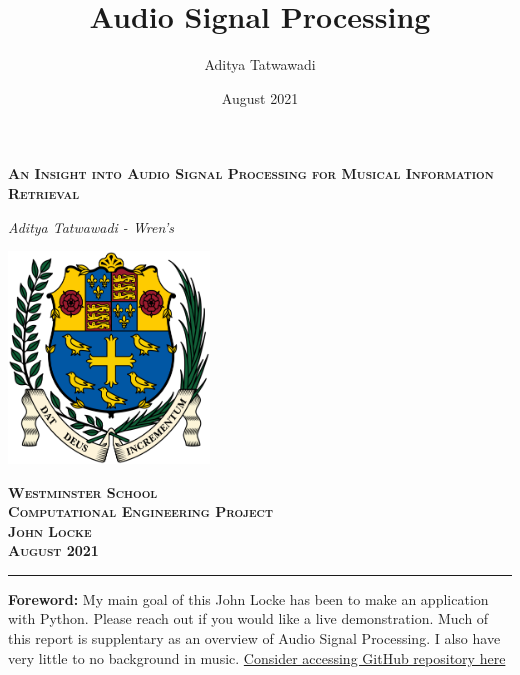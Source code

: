 \documentclass[a4paper,12pt]{article}
\author{Aditya Tatwawadi}
\title{Audio Signal Processing}
\date{August 2021}
\begin{document}
    \begin{titlepage}
        \begin{center}
            \vspace*{1cm}
    
            \LARGE
            \textsc{\textbf{An Insight into Audio Signal Processing for Musical Information Retrieval}}
    
            \vspace{0.5cm}
                
            \textit{Aditya Tatwawadi - Wren's}
                
            \vspace{4cm}
            \LARGE
            \includegraphics[width=0.4\textwidth]{westminsterschool}
            
            \Large
            \textsc{\textbf{
            Westminster School\\
            Computational Engineering Project\\
            John Locke\\
            August 2021}}
                
        \end{center}
    \end{titlepage}


    \doublespacing
    \normalsize
    \tableofcontents
    \begin{center}\rule{0.9\linewidth}{0.5pt}\end{center}
    \lstlistoflistings 
    \singlespacing
    \normalsize
     
    \textbf{Foreword:} 
    \vspace{0.2cm}
    \newline
    My main goal of this John Locke has been to make an application with Python. Please reach out if you would like a live demonstration. Much of this report is supplentary as an overview of Audio Signal Processing. I also have very little to no background in music.
    \newline
    \href{https://github.com/aditya-tatwawadi/Audio-Signal-Processing}{Consider accessing GitHub repository here \parencite{GitHubRepo}}
    \newpage
    
\end{document}
